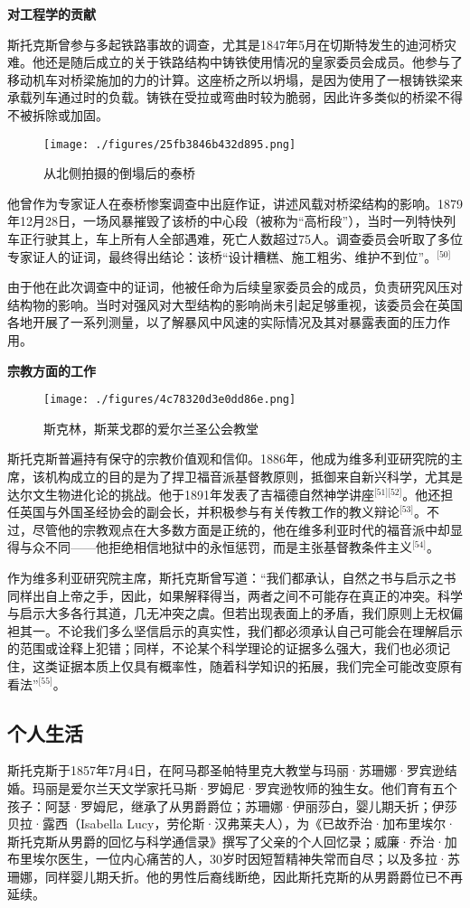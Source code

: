 \textbf{对工程学的贡献}

斯托克斯曾参与多起铁路事故的调查，尤其是1847年5月在切斯特发生的迪河桥灾难。他还是随后成立的关于铁路结构中铸铁使用情况的皇家委员会成员。他参与了移动机车对桥梁施加的力的计算。这座桥之所以坍塌，是因为使用了一根铸铁梁来承载列车通过时的负载。铸铁在受拉或弯曲时较为脆弱，因此许多类似的桥梁不得不被拆除或加固。
\begin{figure}[ht]
\centering
\texttt{[image: ./figures/25fb3846b432d895.png]}
\caption{从北侧拍摄的倒塌后的泰桥} \label{fig_QZstks_8}
\end{figure}
他曾作为专家证人在泰桥惨案调查中出庭作证，讲述风载对桥梁结构的影响。1879年12月28日，一场风暴摧毁了该桥的中心段（被称为“高桁段”），当时一列特快列车正行驶其上，车上所有人全部遇难，死亡人数超过75人。调查委员会听取了多位专家证人的证词，最终得出结论：该桥“设计糟糕、施工粗劣、维护不到位”。\(^\text{[50]}\)

由于他在此次调查中的证词，他被任命为后续皇家委员会的成员，负责研究风压对结构物的影响。当时对强风对大型结构的影响尚未引起足够重视，该委员会在英国各地开展了一系列测量，以了解暴风中风速的实际情况及其对暴露表面的压力作用。

\textbf{宗教方面的工作}

\begin{figure}[ht]
\centering
\texttt{[image: ./figures/4c78320d3e0dd86e.png]}
\caption{斯克林，斯莱戈郡的爱尔兰圣公会教堂} \label{fig_QZstks_9}
\end{figure}
斯托克斯普遍持有保守的宗教价值观和信仰。1886年，他成为维多利亚研究院的主席，该机构成立的目的是为了捍卫福音派基督教原则，抵御来自新兴科学，尤其是达尔文生物进化论的挑战。他于1891年发表了吉福德自然神学讲座\(^\text{[51][52]}\)。他还担任英国与外国圣经协会的副会长，并积极参与有关传教工作的教义辩论\(^\text{[53]}\)。不过，尽管他的宗教观点在大多数方面是正统的，他在维多利亚时代的福音派中却显得与众不同——他拒绝相信地狱中的永恒惩罚，而是主张基督教条件主义\(^\text{[54]}\)。

作为维多利亚研究院主席，斯托克斯曾写道：“我们都承认，自然之书与启示之书同样出自上帝之手，因此，如果解释得当，两者之间不可能存在真正的冲突。科学与启示大多各行其道，几无冲突之虞。但若出现表面上的矛盾，我们原则上无权偏袒其一。不论我们多么坚信启示的真实性，我们都必须承认自己可能会在理解启示的范围或诠释上犯错；同样，不论某个科学理论的证据多么强大，我们也必须记住，这类证据本质上仅具有概率性，随着科学知识的拓展，我们完全可能改变原有看法”\(^\text{[55]}\)。
\subsection{个人生活}
斯托克斯于1857年7月4日，在阿马郡圣帕特里克大教堂与玛丽·苏珊娜·罗宾逊结婚。玛丽是爱尔兰天文学家托马斯·罗姆尼·罗宾逊牧师的独生女。他们育有五个孩子：阿瑟·罗姆尼，继承了从男爵爵位；苏珊娜·伊丽莎白，婴儿期夭折；伊莎贝拉·露西（Isabella Lucy，劳伦斯·汉弗莱夫人），为《已故乔治·加布里埃尔·斯托克斯从男爵的回忆与科学通信录》撰写了父亲的个人回忆录；威廉·乔治·加布里埃尔医生，一位内心痛苦的人，30岁时因短暂精神失常而自尽；以及多拉·苏珊娜，同样婴儿期夭折。他的男性后裔线断绝，因此斯托克斯的从男爵爵位已不再延续。

